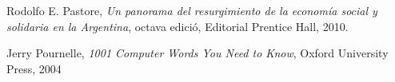 \documentclass[11pt,a4paper]{book}
\begin{document}
\makeCaratulaTIP

\newpage


\newpage


\newpage
\tableofcontents

\newpage


\newpage


\newpage


\newpage


\appendix
%
%
%

\newpage
\begin{thebibliography}{9}

 Rodolfo  E. Pastore, \emph{Un panorama del resurgimiento de la economía social y solidaria en la Argentina}, octava edició, Editorial Prentice Hall, 2010.

 Jerry Pournelle, \emph{1001 Computer Words You Need to Know},  Oxford University Press, 2004


\end{thebibliography}
\end{document}

